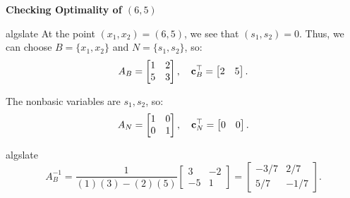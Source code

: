 \begin{solution} \textbf{Checking Optimality of \( (6,5) \)}

\begin{steppanel}{algslate}
At the point $(x_1,x_2) = (6,5)$, we see that $(s_1, s_2) = 0$.  Thus, we can choose 
 \(B= \{x_1, x_2\} \) and $N = \{s_1, s_2\}$, so:
\[
A_B =
\begin{bmatrix}
    1 & 2 \\
    5 & 3
\end{bmatrix}, \quad
\mathbf{c}_B^\top =
\begin{bmatrix}
    2 & 5
\end{bmatrix}.
\]

The nonbasic variables are \( s_1, s_2 \), so:
\[
A_N =
\begin{bmatrix}
    1 & 0 \\
    0 & 1
\end{bmatrix}, \quad
\mathbf{c}_N^\top =
\begin{bmatrix}
    0 & 0
\end{bmatrix}.
\]

\end{steppanel}
\begin{steppanel}{algslate}
\[
A_B^{-1} =
\frac{1}{(1)(3) - (2)(5)}
\begin{bmatrix}
    3 & -2 \\
    -5 & 1
\end{bmatrix}
=
\begin{bmatrix}
    -3/7 & 2/7 \\
    5/7 & -1/7
\end{bmatrix}.
\]


\end{steppanel}
\end{solution}
